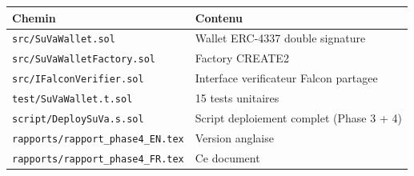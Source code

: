 \documentclass[11pt,a4paper]{article}
\begin{document}
\begin{center}
\begin{tabular}{ll}
\toprule
\textbf{Chemin} & \textbf{Contenu} \\
\midrule
\texttt{src/SuVaWallet.sol}        & Wallet ERC-4337 double signature \\
\texttt{src/SuVaWalletFactory.sol} & Factory CREATE2 \\
\texttt{src/IFalconVerifier.sol}   & Interface verificateur Falcon partagee \\
\texttt{test/SuVaWallet.t.sol}     & 15 tests unitaires \\
\texttt{script/DeploySuVa.s.sol}   & Script deploiement complet (Phase 3 + 4) \\
\texttt{rapports/rapport\_phase4\_EN.tex} & Version anglaise \\
\texttt{rapports/rapport\_phase4\_FR.tex} & Ce document \\
\bottomrule
\end{tabular}
\end{center}

\end{document}
